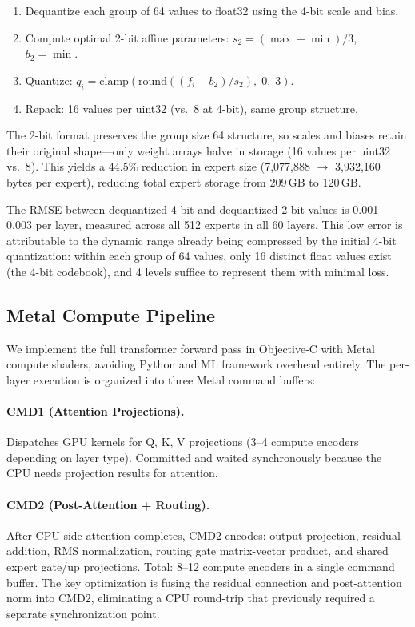 \documentclass[11pt,twocolumn]{article}
\begin{document}
\begin{enumerate}[leftmargin=*,itemsep=1pt]
    \item Dequantize each group of 64 values to float32 using the 4-bit scale and bias.
    \item Compute optimal 2-bit affine parameters: $s_2 = (\max - \min) / 3$, $b_2 = \min$.
    \item Quantize: $q_i = \text{clamp}(\text{round}((f_i - b_2) / s_2),\; 0,\; 3)$.
    \item Repack: 16 values per uint32 (vs.\ 8 at 4-bit), same group structure.
\end{enumerate}

The 2-bit format preserves the group size 64 structure, so scales and biases retain their original shape---only weight arrays halve in storage (16 values per uint32 vs.\ 8).
This yields a 44.5\% reduction in expert size (7{,}077{,}888 $\to$ 3{,}932{,}160 bytes per expert), reducing total expert storage from 209\,GB to 120\,GB.

The RMSE between dequantized 4-bit and dequantized 2-bit values is 0.001--0.003 per layer, measured across all 512 experts in all 60 layers.
This low error is attributable to the dynamic range already being compressed by the initial 4-bit quantization: within each group of 64 values, only 16 distinct float values exist (the 4-bit codebook), and 4 levels suffice to represent them with minimal loss.

\subsection{Metal Compute Pipeline}
\label{sec:pipeline}

We implement the full transformer forward pass in Objective-C with Metal compute shaders, avoiding Python and ML framework overhead entirely.
The per-layer execution is organized into three Metal command buffers:

\paragraph{CMD1 (Attention Projections).}
Dispatches GPU kernels for Q, K, V projections (3--4 compute encoders depending on layer type).
Committed and waited synchronously because the CPU needs projection results for attention.

\paragraph{CMD2 (Post-Attention + Routing).}
After CPU-side attention completes, CMD2 encodes: output projection, residual addition, RMS normalization, routing gate matrix-vector product, and shared expert gate/up projections.
Total: 8--12 compute encoders in a single command buffer.
The key optimization is fusing the residual connection and post-attention norm into CMD2, eliminating a CPU round-trip that previously required a separate synchronization point.
\end{document}
